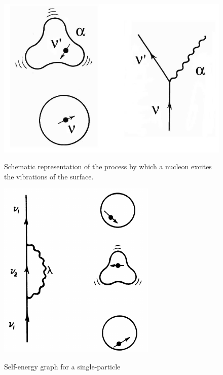 \documentclass[a4paper,14pt]{book}
\begin{document}
\begin{figure}[h!]
\centerline {
{\includegraphics*[width=\textwidth]{figs_C4S/fig_4_1}}
}
\caption{Schematic representation of the process by which a nucleon excites the vibrations of the surface.}
\label{fig:4.1}
\end{figure}

\begin{figure}[h!]
\centerline {
{\includegraphics*[width=\textwidth]{figs_C4S/fig_4_2}}
}
\caption{Self-energy graph for a single-particle}
\label{fig:4.2}
\end{figure}
\end{document}
